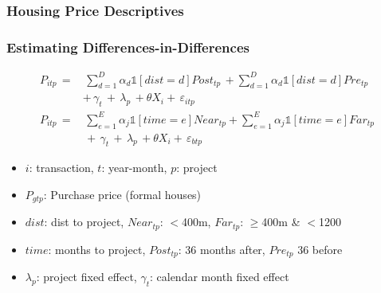 \documentclass[aspectratio=149]{beamer}
\begin{document}


\begin{frame}
\frametitle{Housing Price Descriptives}
\centering
\vspace{.1cm}
\resizebox{.95\textwidth}{!}{  

}
\end{frame}



\begin{frame}
\frametitle{Estimating Differences-in-Differences}

\begin{align*}
P_{itp} \, =& \, \sum_{d=1}^{D} \alpha_d \mathds{1}[dist=d] Post_{tp} \, + \sum_{d=1}^{D} \alpha_d \mathds{1}[dist=d] Pre_{tp} \\
& + \, \gamma_t \, + \, \lambda_p \, + \theta X_{i} + \, \varepsilon_{itp} \\
P_{itp} \, =& \, \sum_{e=1}^{E} \alpha_j \mathds{1}[time=e] Near_{tp} + \sum_{e=1}^{E} \alpha_j \mathds{1}[time=e] Far_{tp} \\
& \, + \, \gamma_t \, + \, \lambda_p \, + \theta X_{i} + \, \varepsilon_{btp}
\end{align*}

\begin{itemize}
\item $i$: transaction, $t$: year-month, $p$: project
\item $P_{gtp}$: Purchase price (formal houses)
\item $dist$: dist to project, $Near_{tp}$: $<$400m, $Far_{tp}$: $\geq$400m \& $<$1200
\item $time$: months to project, $Post_{tp}$: 36 months after, $Pre_{tp}$ 36 before
\item $\lambda_p$: project fixed effect, $\gamma_t$: calendar month fixed effect
\end{itemize}


\end{frame}
\end{document}
